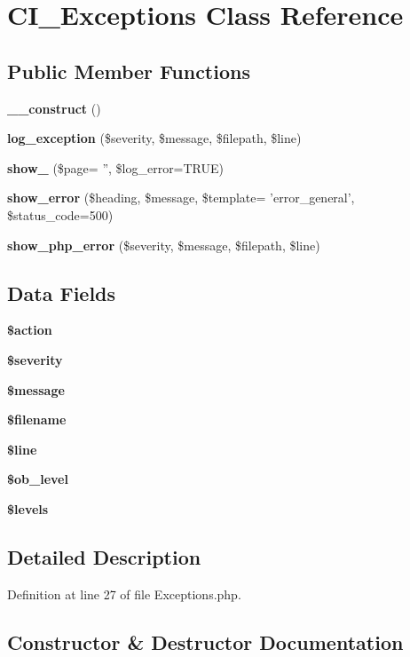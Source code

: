 \section{C\-I\-\_\-\-Exceptions Class Reference}
\label{class_c_i___exceptions}
\subsection*{Public Member Functions}
\begin{DoxyCompactItemize}
\item 
{\bf \-\_\-\-\_\-construct} ()
\item 
{\bf log\-\_\-exception} (\$severity, \$message, \$filepath, \$line)
\item 
{\bf show\-\_} (\$page= '', \$log\-\_\-error=T\-R\-U\-E)
\item 
{\bf show\-\_\-error} (\$heading, \$message, \$template= 'error\-\_\-general', \$status\-\_\-code=500)
\item 
{\bf show\-\_\-php\-\_\-error} (\$severity, \$message, \$filepath, \$line)
\end{DoxyCompactItemize}
\subsection*{Data Fields}
\begin{DoxyCompactItemize}
\item 
{\bf \$action}
\item 
{\bf \$severity}
\item 
{\bf \$message}
\item 
{\bf \$filename}
\item 
{\bf \$line}
\item 
{\bf \$ob\-\_\-level}
\item 
{\bf \$levels}
\end{DoxyCompactItemize}


\subsection{Detailed Description}


Definition at line 27 of file Exceptions.\-php.



\subsection{Constructor \& Destructor Documentation}

